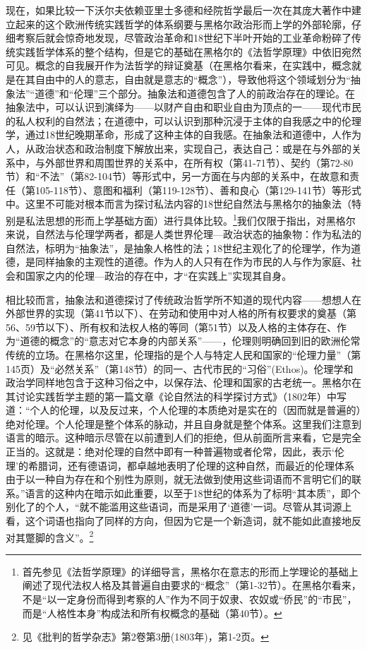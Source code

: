现在，如果比较一下沃尔夫依赖亚里士多德和经院哲学最后一次在其庞大著作中建立起来的这个欧洲传统实践哲学的体系纲要与黑格尔政治形而上学的外部轮廓，仔细考察后就会惊奇地发现，尽管政治革命和18世纪下半叶开始的工业革命粉碎了传统实践哲学体系的整个结构，但是它的基础在黑格尔的《法哲学原理》中依旧宛然可见。概念的自我展开作为法哲学的辩证奠基（在黑格尔看来，在实践中，概念就是在其自由中的人的意志，自由就是意志的“概念”），导致他将这个领域划分为“抽象法”“道德”和“伦理”三个部分。抽象法和道德包含了人的前政治存在的理论。在抽象法中，可以认识到演绎为——以财产自由和职业自由为顶点的一——现代市民的私人权利的自然法；在道德中，可以认识到那种沉浸于主体的自我感之中的伦理学，通过18世纪晚期革命，形成了这种主体的自我感。在抽象法和道德中，人作为人，从政治状态和政治制度下解放出来，实现自己，表达自己：或是在与外部的关系中，与外部世界和周围世界的关系中，在所有权（第41-71节）、契约（第72-80节）和“不法”（第82-104节）等形式中，另一方面在与内部的关系中，在故意和责任（第105-118节）、意图和福利（第119-128节）、善和良心（第129-141节）等形式中。这里不可能对根本而言为探讨私法内容的18世纪自然法与黑格尔的抽象法（特别是私法思想的形而上学基础方面）进行具体比较。\footnote{首先参见《法哲学原理》的详细导言，黑格尔在意志的形而上学理论的基础上阐述了现代法权人格及其普遍自由要求的“概念”（第1-32节）。在黑格尔看来，不是“以一定身份而得到考察的人”作为不同于奴隶、农奴或“侨民”的“市民”，而是“人格性本身”构成法和所有权概念的基础（第40节）。}我们仅限于指出，对黑格尔来说，自然法与伦理学两者，都是人类世界伦理—政治状态的抽象物：作为私法的自然法，标明为“抽象法”，是抽象人格性的法；18世纪主观化了的伦理学，作为道德，是同样抽象的主观性的道德。作为人的人只有在作为市民的人与作为家庭、社会和国家之内的伦理—政治的存在中，才“在实践上”实现其自身。

相比较而言，抽象法和道德探讨了传统政治哲学所不知道的现代内容——想想人在外部世界的实现（第41节以下）、在劳动和使用中对人格的所有权要求的奠基（第56、59节以下）、所有权和法权人格的等同（第51节）以及人格的主体存在、作为“道德的概念”的“意志对它本身的内部关系”——，伦理则明确回到旧的欧洲伦常传统的立场。在黑格尔这里，伦理指的是个人与特定人民和国家的“伦理力量”（第145页）及“必然关系”（第148节）的同一、古代市民的“习俗”(Ethos)。伦理学和政治学同样地包含于这种习俗之中，以保存法、伦理和国家的古老统一。黑格尔在其讨论实践哲学主题的第一篇文章《论自然法的科学探讨方式》（1802年）中写道：“个人的伦理，以及反过来，个人伦理的本质绝对是实在的（因而就是普遍的）绝对伦理。个人伦理是整个体系的脉动，并且自身就是整个体系。这里我们注意到语言的暗示。这种暗示尽管在以前遭到人们的拒绝，但从前面所言来看，它是完全正当的。这就是：绝对伦理的自然中即有一种普遍物或者伦常，因此，表示‘伦理’的希腊词，还有德语词，都卓越地表明了伦理的这种自然，而最近的伦理体系由于以一种自为存在和个别性为原则，就无法做到使用这些词语而不言明它们的联系。”语言的这种内在暗示如此重要，以至于18世纪的体系为了标明“其本质”，即个别化了的个人，“就不能滥用这些语词，而是采用了‘道德’一词。尽管从其词源上看，这个词语也指向了同样的方向，但因为它是一个新造词，就不能如此直接地反对其蹩脚的含义”。\footnote{见《批判的哲学杂志》第2卷第3册(1803年)，第1-2页。}

